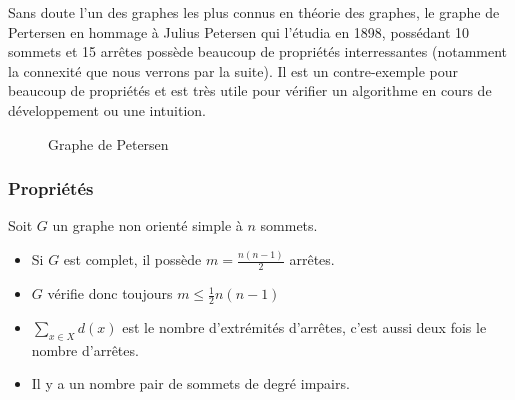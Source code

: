 \begin{example}
    Sans doute l'un des graphes les plus connus en théorie des graphes, 
    le graphe de Pertersen en hommage à Julius Petersen qui l'étudia en 1898, possédant 10 sommets et 15 arrêtes possède 
    beaucoup de propriétés interressantes (notamment la connexité que nous verrons par la suite).
    Il est un contre-exemple pour beaucoup de propriétés et est très utile pour vérifier un algorithme en cours de développement ou une intuition. 
    \begin{figure}[h]
        \centering
            \caption{Graphe de Petersen}
            \label{fig:K5-entiers}
    \end{figure}
\end{example}


\subsubsection{Propriétés}

\begin{prop}
    Soit $G$ un graphe non orienté simple à $n$ sommets.
    \begin{itemize}
        \item Si $G$ est complet, il possède $m =\frac{n(n-1)}{2}$ arrêtes.
        \item $G$ vérifie donc toujours $ m \leq \frac{1}{2} n (n-1)$
        \item $\sum_{x \in X} d(x)$ est le nombre d'extrémités d'arrêtes, c'est aussi deux fois le nombre d'arrêtes.
        \item Il y a un nombre pair de sommets de degré impairs.
    \end{itemize}
\end{prop}


